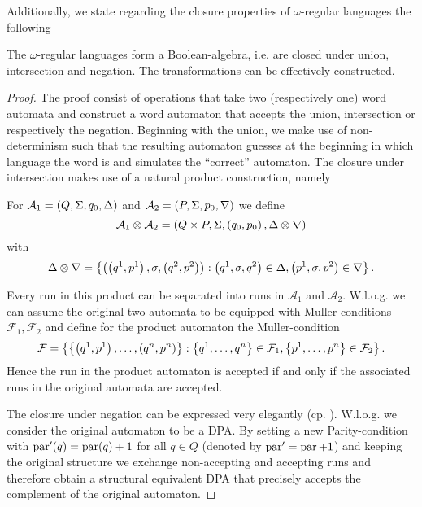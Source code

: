 Additionally, we state regarding the closure properties of $\omega$-regular
languages the following
\begin{theorem}
  \cite[Consequence from Theorem 1.5 and Theorem 1.24]{AutoLogInfGames}
  The $\omega$-regular languages form a Boolean-algebra, i.e. are closed under
  union, intersection and negation. The transformations can be effectively
  constructed.
  \label{thm:omegaregboolean}
\end{theorem}
\begin{proof}
  The proof consist of operations that take two (respectively one) word
  automata and construct a word automaton that accepts the union, intersection
  or respectively the negation. Beginning with the union, we make use of
  non-determinism such that the resulting automaton guesses at the beginning in
  which language the word is and simulates the \enquote{correct} automaton. The 
  closure under intersection makes use of a natural product construction,
  namely
  \begin{definition}
    For $\mathcal{A}_{1} = \left(Q, \Sigma, q_{0}, \Delta\right)$ and
    $\mathcal{A}_{2} = \left(P, \Sigma, p_{0}, \nabla\right)$ we define
    \begin{equation*}
      \mathcal{A}_{1}\otimes\mathcal{A}_{2} = \left(Q\times P, \Sigma, 
      \left(q_{0}, p_{0}\right), \Delta\otimes\nabla\right)
    \end{equation*}
    with
    \begin{equation*}
      \Delta\otimes\nabla = 
      \left\{\left(\left(q^{1}, p^{1}\right), \sigma, 
      \left(q^{2}, p^{2}\right)\right): \left(q^{1},\sigma, q^{2}\right)\in\Delta, 
      \left(p^{1},\sigma, p^{2}\right)\in\nabla\right\}.
    \end{equation*}
  \end{definition}
  Every run in this product can be separated into runs in $\mathcal{A}_{1}$ and
  $\mathcal{A}_{2}$. W.l.o.g. we can assume the original two automata to be
  equipped with Muller-conditions $\mathcal{F}_{1},\mathcal{F}_{2}$ and define
  for the product automaton the Muller-condition 
  \begin{equation*}
    \mathcal{F} = \left\{\left\{\left(q^{1}, p^{1}\right),\dots,\left(q^{n}, p^{n}\right)\right\}:
    \left\{q^{1},\dots,q^{n}\right\}\in\mathcal{F}_{1},
    \left\{p^{1},\dots,p^{n}\right\}\in\mathcal{F}_{2}\right\}.
  \end{equation*}
  Hence the run in the product automaton is accepted if and only if the
  associated runs in the original automata are accepted.

  The closure under negation can be expressed very elegantly (cp.
  \cite[Transformation 1.25.]{AutoLogInfGames}). W.l.o.g. we consider the
  original automaton to be a \ac{DPA}. By setting a new Parity-condition with
  $\operatorname{par}'(q) = \operatorname{par}(q) + 1$ for all $q\in Q$ (denoted by
  $\operatorname{par}' = \operatorname{par} + 1$) and keeping the original structure we exchange
  non-accepting and accepting runs and therefore obtain a structural equivalent
  \ac{DPA} that precisely accepts the complement of the original automaton.
\end{proof}

